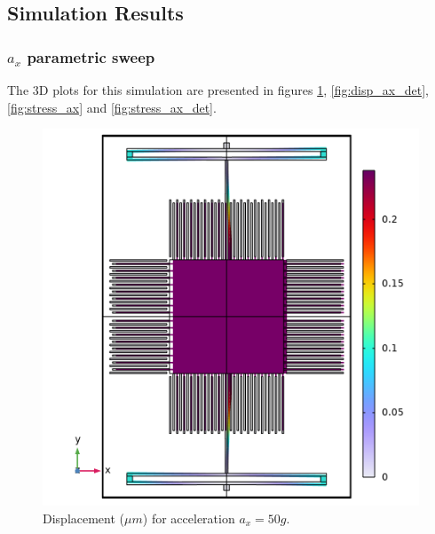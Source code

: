 \documentclass[lettersize,journal]{IEEEtran}
\begin{document}
    \subsection{Simulation Results}
    \subsubsection{\(a_x\) parametric sweep}
    The 3D plots for this simulation are presented in figures \ref{fig:disp_ax}, \ref{fig:disp_ax_det}, \ref{fig:stress_ax} and \ref{fig:stress_ax_det}.
     
    \begin{figure}[!h]
        \centering
        \includegraphics[width=1.0\linewidth]{displacement_ax}
        \caption{Displacement (\(\mu m\)) for acceleration \(a_x=50g\).}
        \label{fig:disp_ax}
    \end{figure}
    
\end{document}
